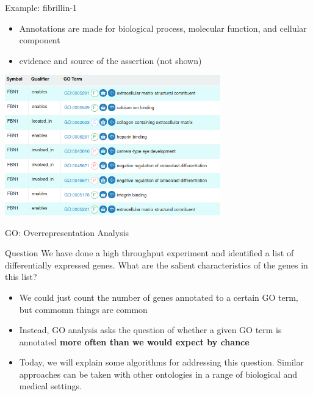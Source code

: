\documentclass{beamer}
\begin{document}
\begin{frame}{Example: fibrillin-1}
\begin{itemize}
\item Annotations are made for biological process, molecular function, and cellular component
\item evidence and source of the assertion (not shown)
\end{itemize} 

\begin{center}
\includegraphics[width=0.7\textwidth]{img/fbn1-goa.png}
\end{center}
\end{frame}


\begin{frame}{GO: Overrepresentation Analysis}
\begin{mybluebox}{Question}
We have done a high throughput experiment and identified a list of differentially 
expressed genes. What are the salient characteristics of the genes in this list?
\end{mybluebox}

 \begin{itemize}
  \item We could just count the number of genes annotated to a certain GO term, but commomn things are common
  \item Instead, GO analysis asks the question of whether a given GO term is annotated {\bf more often than we would expect by chance}
\item Today, we will explain some algorithms for addressing this question. Similar approaches can be taken with other ontologies in a range of biological and medical settings.
 \end{itemize}

\end{frame}
\end{document}
